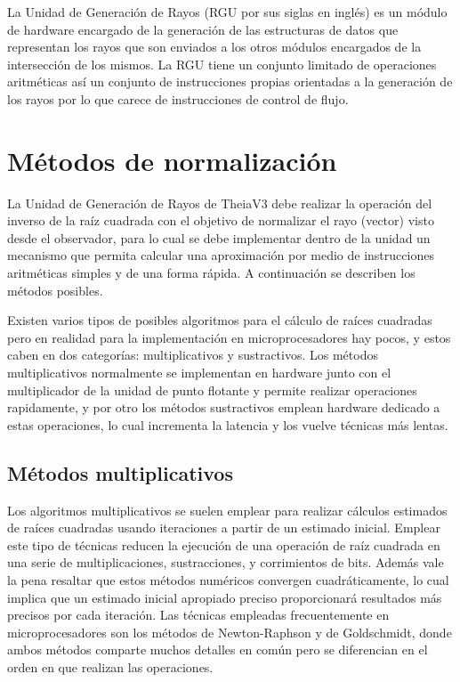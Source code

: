 La Unidad de Generación de Rayos (RGU por sus siglas en inglés) es un módulo de hardware encargado de la generación de las estructuras de datos que representan los rayos que son enviados a los otros módulos encargados de la intersección de los mismos. La RGU tiene un conjunto limitado de operaciones aritméticas así un conjunto de instrucciones propias orientadas a la generación de los rayos por lo que carece de instrucciones de control de flujo.  

\section{Métodos de normalización}

La Unidad de Generación de Rayos de TheiaV3 debe realizar la operación del inverso de la raíz cuadrada con el objetivo de normalizar el rayo (vector) visto desde el observador, para lo cual se debe implementar dentro de
la unidad un mecanismo que permita calcular una aproximación por medio de instrucciones aritméticas simples y de una forma rápida.  A continuación se describen los métodos posibles. 

Existen varios tipos de posibles algoritmos para el cálculo de raíces cuadradas pero en realidad para la implementación en microprocesadores hay pocos, y estos caben en dos categorías: multiplicativos y sustractivos. Los métodos multiplicativos normalmente se implementan en hardware junto con el multiplicador de la unidad de punto flotante y permite realizar operaciones rapidamente, y por otro los métodos sustractivos emplean hardware dedicado a estas operaciones, lo cual incrementa la latencia y los vuelve técnicas más lentas.   

\subsection{Métodos multiplicativos}

Los algoritmos multiplicativos se suelen emplear para realizar cálculos estimados de raíces cuadradas usando iteraciones a partir de un estimado inicial. Emplear este tipo de técnicas reducen la ejecución de una operación de raíz cuadrada en una serie de multiplicaciones, sustracciones, y corrimientos de bits. Además vale la pena resaltar que estos métodos numéricos convergen cuadráticamente, lo cual implica que un estimado inicial apropiado preciso proporcionará resultados más precisos por cada iteración. Las técnicas empleadas frecuentemente en microprocesadores son los métodos de Newton-Raphson y de Goldschmidt, donde ambos métodos comparte muchos detalles en común pero se diferencian en el orden en que realizan las operaciones.

